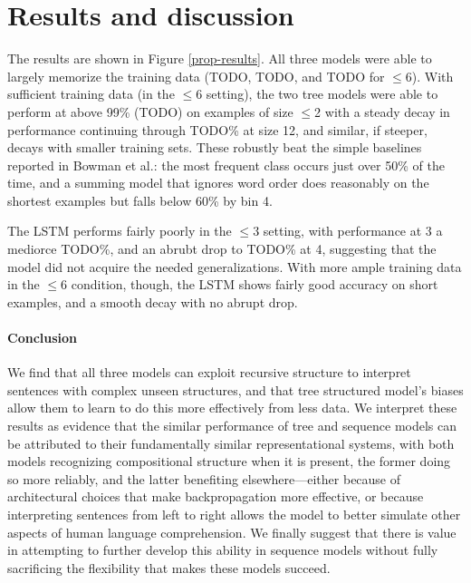 \section{Results and discussion}\label{sec:discussion}

The results are shown in Figure \ref{prop-results}. All three models were able to largely memorize the training data (TODO, TODO, and TODO for $\le$6). With sufficient training data (in the $\le$6 setting), the two tree models were able to perform at above 99\% (TODO) on examples of size $\le$2 with a steady decay in performance continuing through TODO\% at size 12, and similar, if steeper, decays with smaller training sets. These robustly beat the simple baselines reported in Bowman et al.: the most frequent class occurs just over 50\% of the time, and a summing model that ignores word order does reasonably on the shortest examples but falls below 60\% by bin 4.

The LSTM performs fairly poorly in the $\le3$ setting, with performance at 3 a mediorce TODO\%, and an abrubt drop to TODO\% at 4, suggesting that the model did not acquire the needed generalizations. With more ample training data in the $\le6$ condition, though, the LSTM shows fairly good accuracy on short examples, and a smooth decay with no abrupt drop. 

\paragraph{Conclusion}

We find that all three  models can exploit recursive structure to interpret sentences with complex unseen structures, and that tree structured model's biases allow them to learn to do this more effectively from less data. 
We interpret these results as evidence that the similar performance of tree and sequence models can be attributed to their fundamentally similar representational systems, with both models recognizing compositional structure when it is present, the former doing so more reliably, and the latter benefiting elsewhere---either because of architectural choices that make backpropagation more effective, or because interpreting sentences from left to right allows the model to better simulate other aspects of human language comprehension. We finally suggest that there is value in attempting to further develop this ability in sequence models without fully sacrificing the flexibility that makes these models succeed.
